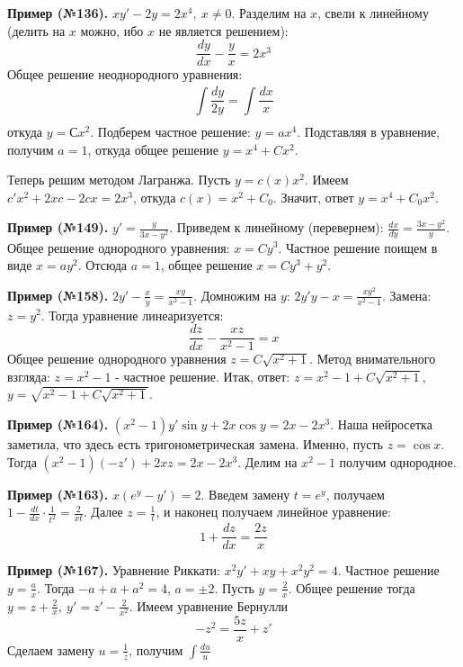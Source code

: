 \textbf{Пример (№136).} $xy'-2y=2x^4,~x\ne0$. Разделим на  $x$, свели к
линейному (делить на $x$ можно, ибо  $x$ не является решением): 
$$\frac{dy}{dx}-\frac{y}{x}=2x^3$$
Общее решение неоднородного уравнения:
$$\int\limits_{}^{}\frac{dy}{2y}=\int\limits_{}^{}\frac{dx}{x}$$ 
откуда $y=Сx^2$. Подберем частное решение:  $y=ax^4$. Подставляя в уравнение,
получим  $a=1$, откуда общее решение  $y=x^4+Cx^2$. 

Теперь решим методом Лагранжа. Пусть $y=c(x)x^2$. Имеем
 $c'x^2+2xc-2cx=2x^3$, откуда $c(x)=x^2+C_0$. Значит, ответ  $y=x^4+C_0x^2$.

\textbf{Пример (№149).} $y'=\frac{y}{3x-y^2}$. Приведем к линейному 
(перевернем): $\frac{dx}{dy}=\frac{3x-y^2}{y}$. Общее решение 
однородного уравнения: $x=Cy^3$. Частное решение поищем в виде $x=ay^2$.
Отсюда $a=1$, общее решение  $x=Cy^3+y^2$.

\textbf{Пример (№158).} $2y'-\frac{x}{y}=\frac{xy}{x^2-1}$. Домножим на 
$y$:  $2y'y-x=\frac{xy^2}{x^2-1}$. Замена: $z=y^2$. Тогда уравнение
линеаризуется: 
$$\frac{dz}{dx}-\frac{xz}{x^2-1}=x$$
Общее решение однородного уравнения $z= C\sqrt{x^2+1}$. Метод 
внимательного взгляда: $z=x^2-1$ - частное решение. Итак, ответ:
$z=x^2-1+C\sqrt{x^2+1}$, $y=\sqrt{x^2-1+C\sqrt{x^2+1}}$.

\textbf{Пример (№164).} $(x^2-1)y'\sin y + 2x\cos y=2x-2x^3$. Наша 
нейросетка заметила, что здесь есть 
тригонометрическая замена. Именно, пусть $z=\cos x$. Тогда
$(x^2-1)(-z')+2xz=2x-2x^3$. Делим на 
$x^2-1$ получим однородное.

\textbf{Пример (№163).} $x(e^y-y')=2$. Введем замену $t=e^y$, получаем
 $1-\frac{dt}{dx}\cdot \frac{1}{t^2}=\frac{2}{xt}$. Далее $z=\frac{1}{t}$, 
 и наконец получаем линейное уравнение:
 $$1+\frac{dz}{dx}=\frac{2z}{x}$$

\textbf{Пример (№167).} Уравнение Риккати: $x^2y'+xy+x^2y^2=4$.
Частное решение $y=\frac{a}{x}$. Тогда
$-a+a+{a^2}=4$, $a=\pm2$. Пусть $y=\frac{2}{x}$. Общее решение тогда
$y=z+\frac{2}{x},~y'=z'-\frac{2}{x^2}$. Имеем уравнение Бернулли
$$-z^2=\frac{5z}{x}+z'$$
Сделаем замену $u=\frac{1}{z}$, получим $\int\limits_{}^{}\frac{du}{u} $




